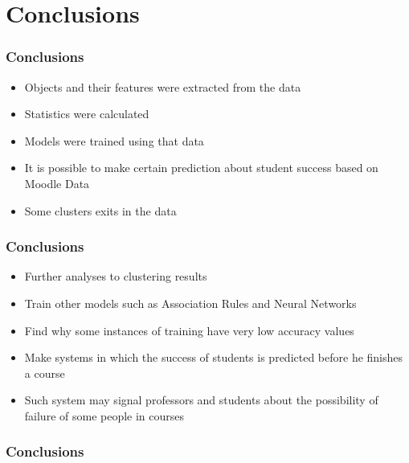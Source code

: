\section{Conclusions}

\begin{frame}
\frametitle{Conclusions}


\vspace{0.5cm}

\begin{itemize}
    \item Objects and their features were extracted from the data
    \item Statistics were calculated
    \item Models were trained using that data
\end{itemize}


\vspace{0.5cm}

\begin{itemize}
    \item It is possible to make certain prediction about student success based on Moodle Data
    \item Some clusters exits in the data
\end{itemize}

\end{frame}

\begin{frame}
\frametitle{Conclusions}


\begin{itemize}
    \item Further analyses to clustering results
    \item Train other models such as Association Rules and Neural Networks
    \item Find why some instances of training have very low accuracy values
\end{itemize}

\vspace{0.5cm}


\begin{itemize}
    \item Make systems in which the success of students is predicted before he finishes a course
    \item Such system may signal professors and students about the possibility of failure of some people in courses
\end{itemize}

\end{frame}

\begin{frame}
\frametitle{Conclusions}


\end{frame}
